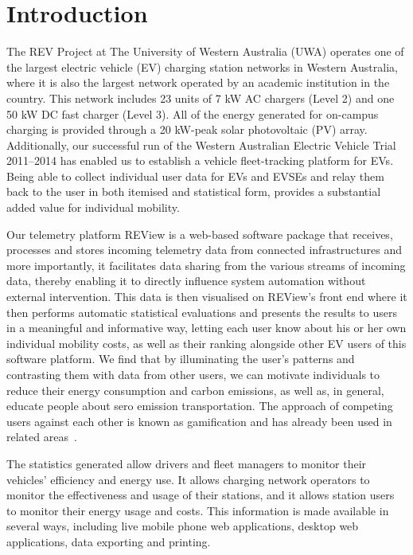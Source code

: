 \section{Introduction}
\label{sec:9:intro}
The REV Project at The University of Western Australia (UWA) operates one of the largest electric vehicle (EV) charging station networks in Western Australia, where it is also the largest network operated by an academic institution in the country. This network includes 23 units of 7 kW AC chargers (Level 2) and one 50 kW DC fast charger (Level 3). All of the energy generated for on-campus charging is provided through a 20 kW-peak solar photovoltaic (PV) array. Additionally, our successful run of the Western Australian Electric Vehicle Trial 2011--2014 has enabled us to establish a vehicle fleet-tracking platform for EVs. Being able to collect individual user data for EVs and EVSEs and relay them back to the user in both itemised and statistical form, provides a substantial added value for individual mobility.


Our telemetry platform REView is a web-based software package that receives, processes and stores incoming telemetry data from connected infrastructures and more importantly, it facilitates data sharing from the various streams of incoming data, thereby enabling it to directly influence system automation without external intervention. This data is then visualised on REView’s front end where it then performs automatic statistical evaluations and presents the results to users in a meaningful and informative way, letting each user know about his or her own individual mobility costs, as well as their ranking alongside other EV users of this software platform. We find that by illuminating the user’s patterns and contrasting them with data from other users, we can motivate individuals to reduce their energy consumption and carbon emissions, as well as, in general, educate people about sero emission transportation. The approach of competing users against each other is known as gamification and has already been used in related areas~\cite{magana_gafu:_2015}.

The statistics generated allow drivers and fleet managers to monitor their vehicles’ efficiency and energy use. It allows charging network operators to monitor the effectiveness and usage of their stations, and it allows station users to monitor their energy usage and costs. This information is made available in several ways, including live mobile phone web applications, desktop web applications, data exporting and printing.  

